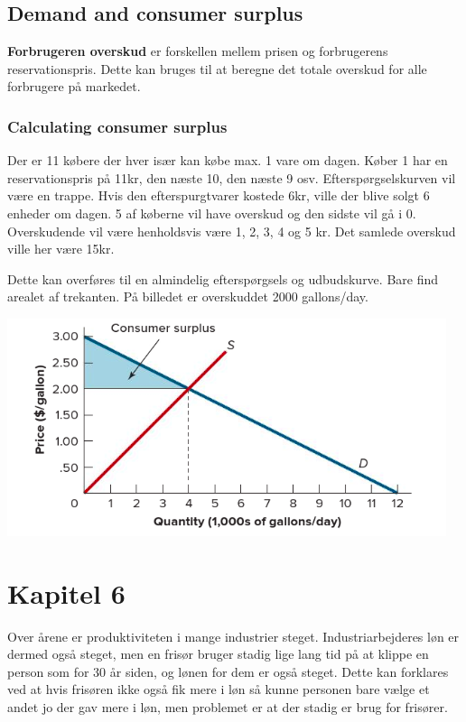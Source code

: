 \subsection{Demand and consumer surplus}
\textbf{Forbrugeren overskud} er forskellen mellem prisen og forbrugerens reservationspris. Dette kan bruges til at beregne det totale overskud for alle forbrugere på markedet. 

\subsubsection{Calculating consumer surplus}
\begin{eks} \textbf{} %
\newline
Der er 11 købere der hver især kan købe max. 1 vare om dagen. Køber 1 har en reservationspris på 11kr, den næste 10, den næste 9 osv. Efterspørgselskurven vil være en trappe. Hvis den efterspurgtvarer kostede 6kr, ville der blive solgt 6 enheder om dagen. 5 af køberne vil have overskud og den sidste vil gå i 0. Overskudende vil være henholdsvis være 1, 2, 3, 4 og 5 kr. Det samlede overskud ville her være 15kr. 
\end{eks}

Dette kan overføres til en almindelig efterspørgsels og udbudskurve. Bare find arealet af trekanten. På billedet er overskuddet 2000 gallons/day. 

\includegraphics[scale=0.8]{Afsnit/Lektion2/Consumersurplus.png}

\section{Kapitel 6}
Over årene er produktiviteten i mange industrier steget. Industriarbejderes løn er dermed også steget, men en frisør bruger stadig lige lang tid på at klippe en person som for 30 år siden, og lønen for dem er også steget. Dette kan forklares ved at hvis frisøren ikke også fik mere i løn så kunne personen bare vælge et andet jo der gav mere i løn, men problemet er at der stadig er brug for frisører. 

